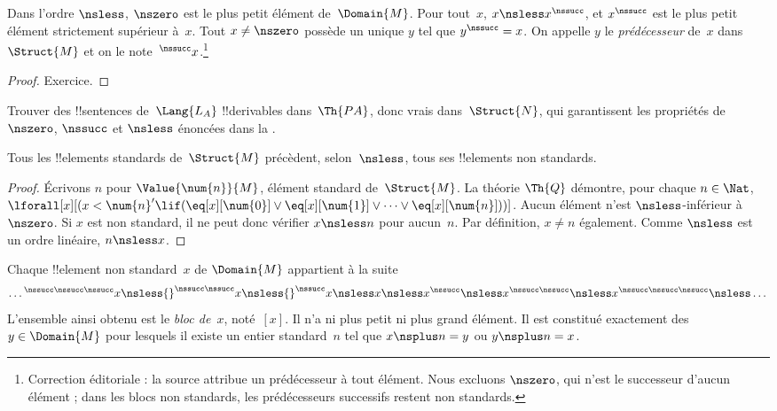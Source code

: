 \documentclass[../../../include/open-logic-section]{subfiles}
\begin{document}
\begin{prop}
Dans l'ordre $\nsless$, $\nszero$ est le plus
petit élément de~$\Domain{M}$. Pour tout~$x$,
$x\nsless x^\nssucc$, et $x^\nssucc$ est
le plus petit élément strictement supérieur
à~$x$. Tout $x\neq\nszero$ possède un
unique $y$ tel que $y^\nssucc=x$.
On appelle $y$ le \emph{prédécesseur} de~$x$
dans~$\Struct{M}$ et on le note~$^\nssucc x$.\footnote{Correction éditoriale : la source attribue un prédécesseur à tout élément. Nous excluons $\nszero$, qui n'est le successeur d'aucun élément ; dans les blocs non standards, les prédécesseurs successifs restent non standards.}
\end{prop}

\begin{proof}
Exercice.
\end{proof}

\begin{prob}
Trouver des !!{sentence}s de~$\Lang{L_A}$
!!{derivable}s dans~$\Th{PA}$, donc vrais
dans~$\Struct{N}$, qui garantissent les
propriétés de $\nszero$, $\nssucc$ et
$\nsless$ énoncées dans la
.
\end{prob}

\begin{prop}
Tous les !!{element}s standards de~$\Struct{M}$
précèdent, selon~$\nsless$, tous ses
!!{element}s non standards.
\end{prop}

\begin{proof}
Écrivons $n$ pour
$\Value{\num{n}}{M}$, élément standard
de~$\Struct{M}$. La théorie $\Th{Q}$ démontre,
pour chaque $n\in\Nat$,
$\lforall[x][(x<\num{n}'\lif
(\eq[x][\num{0}]\lor\eq[x][\num{1}]
\lor\dots\lor\eq[x][\num{n}]))]$.
Aucun élément n'est $\nsless$-inférieur
à~$\nszero$. Si $x$ est non standard,
il ne peut donc vérifier $x\nsless n$
pour aucun~$n$. Par définition,
$x\neq n$ également. Comme $\nsless$
est un ordre linéaire, $n\nsless x$.
\end{proof}

\begin{prop}
Chaque !!{element} non standard~$x$ de
$\Domain{M}$ appartient à la suite
\[
\dots {}^{\nssucc\nssucc\nssucc}x
\nsless {}^{\nssucc\nssucc}x
\nsless {}^{\nssucc}x
\nsless x
\nsless x^{\nssucc}
\nsless x^{\nssucc\nssucc}
\nsless x^{\nssucc\nssucc\nssucc}
\nsless\dots
\]
L'ensemble ainsi obtenu est le
\emph{bloc de~$x$}, noté~$[x]$.
Il n'a ni plus petit ni plus grand élément.
Il est constitué exactement des
$y\in\Domain{M}$ pour lesquels il existe
un entier standard~$n$ tel que
$x\nsplus n=y$ ou $y\nsplus n=x$.
\end{prop}
\end{document}
